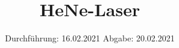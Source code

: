

\subject{Nr. 61}
\title{HeNe-Laser}
\date{%
  Durchführung: 16.02.2021
  \hspace{3em}
  Abgabe: 20.02.2021
}



\maketitle
\thispagestyle{empty}
\tableofcontents
\newpage






\printbibliography{}



